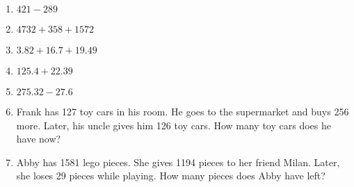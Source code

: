 \documentclass{article}
\begin{document}
\begin{enumerate}
\item \quad \( 421 - 289\)
\vspace{45pt}
\hline
\vspace{5pt}

\item \quad \( 4732 + 358 + 1572\)
\vspace{80pt}
\hline
\vspace{5pt}

\item \quad \( 3.82 + 16.7 + 19.49\)
\vspace{80pt}
\hline
\vspace{5pt}

\item \quad \( 125.4 + 22.39\)
\vspace{75pt}
\hline
\vspace{5pt}

\item \quad \( 275.32 - 27.6 \)
\vspace{80pt}
\hline
\vspace{5pt}

\item \quad Frank has 127 toy cars in his room. He goes to the supermarket and buys 256 more. Later, his uncle gives him 126 toy cars. How many toy cars does he have now?
\vspace{80pt}
\hline
\vspace{5pt}

\item \quad Abby has 1581 lego pieces. She gives 1194 pieces to her  friend Milan. Later, she loses 29 pieces while playing. How many pieces does Abby have left?


\end{enumerate}


\end{document}
